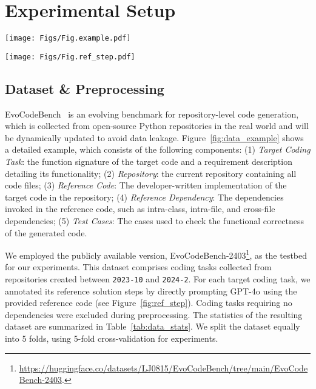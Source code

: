 \section{Experimental Setup}
\label{appendix:exp_setup}


\begin{figure*}[ht]
\centering
\texttt{[image: Figs/Fig.example.pdf]}
\caption{An example in EvoCodeBench.}
\label{fig:data_example}
\end{figure*}

\begin{figure*}[ht]
\centering
\texttt{[image: Figs/Fig.ref\_step.pdf]}
\caption{The reference solution steps annotated for the example in Figure~\ref{fig:data_example}.}
\label{fig:ref_step}
\end{figure*}

\subsection{Dataset \& Preprocessing}
\label{appendix:dataset}
EvoCodeBench~\cite{li2024evocodebench} is an evolving benchmark for repository-level code generation, which is collected from open-source Python repositories in the real world and will be dynamically updated to avoid data leakage. Figure~\ref{fig:data_example} shows a detailed example, which consists of the following components: (1) \textit{Target Coding Task}: the function signature of the target code and a requirement description detailing its functionality; (2) \textit{Repository}: the current repository containing all code files; (3) \textit{Reference Code}: The developer-written implementation of the target code in the repository; (4) \textit{Reference Dependency}: The dependencies invoked in the reference code, such as intra-class, intra-file, and cross-file dependencies; (5) \textit{Test Cases}: The cases used to check the functional correctness of the generated code.

We employed the publicly available version, EvoCodeBench-2403\footnote{\url{https://huggingface.co/datasets/LJ0815/EvoCodeBench/tree/main/EvoCodeBench-2403}.}, as the testbed for our experiments. This dataset comprises coding tasks collected from repositories created between \texttt{2023-10} and \texttt{2024-2}. For each target coding task, we annotated its reference solution steps by directly prompting GPT-4o \cite{openai2024gpt4o} using the provided reference code (see Figure~\ref{fig:ref_step}). Coding tasks requiring no dependencies were excluded during preprocessing. The statistics of the resulting dataset are summarized in Table~\ref{tab:data_stats}. We split the dataset equally into 5 folds, using 5-fold cross-validation for experiments.




